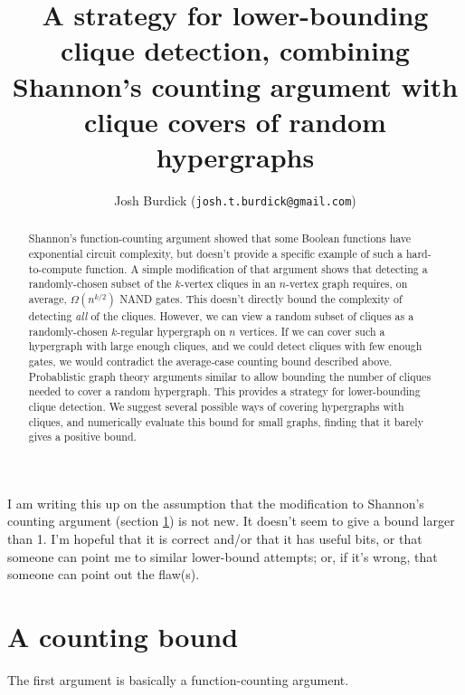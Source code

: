 \documentclass[12pt]{article}
\theoremstyle{definition}
\begin{document}
\title{A strategy for lower-bounding clique detection, combining
Shannon's counting argument with clique covers of random hypergraphs}

\author{Josh Burdick ({\tt josh.t.burdick@gmail.com})}
\maketitle
\begin{abstract}
Shannon's function-counting argument
\cite{shannon_synthesis_1949} showed that some Boolean functions have
exponential circuit complexity, but doesn't provide a specific example
of such a hard-to-compute function. A simple modification of that argument
shows that detecting a randomly-chosen subset of the $k$-vertex cliques in an
$n$-vertex graph requires, on average, $\Omega(n^{k/2})$ NAND gates.
This doesn't directly bound the complexity of detecting {\em all} of the cliques.
However, we can view a random subset of cliques as a randomly-chosen
$k$-regular hypergraph on $n$ vertices.
If we can cover such a hypergraph with large enough cliques,
and we could detect cliques with few enough gates, we would contradict
the average-case counting bound described above.
Probablistic graph theory arguments
\cite{bollobas1976cliques} similar to \cite{bollobas1993clique}
allow bounding the number of cliques needed to
cover a random hypergraph.
This provides a strategy for lower-bounding clique detection.
We suggest several possible ways of covering hypergraphs with cliques,
and numerically evaluate this bound for small graphs, finding that
it barely gives a positive bound.
\end{abstract}

I am writing this up on the assumption that the modification
to Shannon's counting argument (section \ref{countingBound})
is not new. It doesn't seem to give a bound larger than 1.
I'm hopeful that it is correct and/or that it has useful bits,
or that someone can point me
to similar lower-bound attempts; or, if it's wrong, that 
someone can point out the flaw(s).

\newpage

\tableofcontents

\section{A counting bound}
\label{countingBound}

The first argument is basically a function-counting argument.
\end{document}
